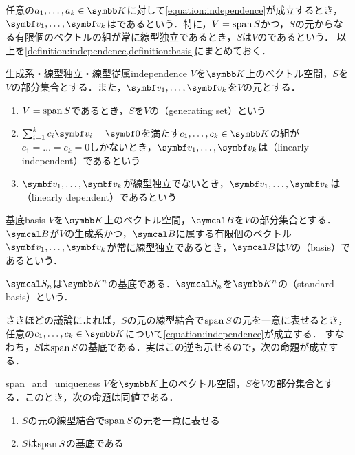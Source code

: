 \documentclass[../../main]{subfiles}
\begin{document}
任意の\(a_1,\dots,a_k\in\numset{K}\)に対して\cref{equation:independence}が成立するとき，
\(\vect{v}_1,\dots,\vect{v}_k\)はであるという．特に，\(V=\operatorname{span} S\)かつ，\(S\)の元からなる有限個のベクトルの組が常に線型独立であるとき，\(S\)は\(V\)のであるという．
以上を\cref{definition:independence,definition:basis}にまとめておく．

\begin{definition}{生成系・線型独立・線型従属}{independence}
  \(V\)を\(\numset{K}\)上のベクトル空間，\(S\)を\(V\)の部分集合とする．また，\(\vect{v}_1,\dots,\vect{v}_k\)を\(V\)の元とする．
  \begin{enumerate}
    \item \(V=\operatorname{span} S\)であるとき，\(S\)を\(V\)の（generating set）という
    \item \(\sum_{i=1}^kc_i\vect{v}_i=\zvec\)を満たす\(c_1,\dots,c_k\in\numset{K}\)の組が\(c_1=\dots=c_k=0\)しかないとき，\(\vect{v}_1,\dots,\vect{v}_k\)は（linearly independent）であるという
    \item \(\vect{v}_1,\dots,\vect{v}_k\)が線型独立でないとき，\(\vect{v}_1,\dots,\vect{v}_k\)は（linearly dependent）であるという
  \end{enumerate}
\end{definition}

\begin{definition}{基底}{basis}
  \(V\)を\(\numset{K}\)上のベクトル空間，\(\basis{B}\)を\(V\)の部分集合とする．
  \(\basis{B}\)が\(V\)の生成系かつ，\(\basis{B}\)に属する有限個のベクトル\(\vect{v}_1,\dots,\vect{v}_k\)が常に線型独立であるとき，\(\basis{B}\)は\(V\)の（basis）であるという．
\end{definition}

\begin{example}[標準基底]
  \(\basis{S}_n\)は\(\numset{K}^n\)の基底である．\(\basis{S}_n\)を\(\numset{K}^n\)の（standard basis）という．
\end{example}

さきほどの議論によれば，\(S\)の元の線型結合で\(\operatorname{span} S\)の元を一意に表せるとき，任意の\(c_1,\dots,c_k\in\numset{K}\)について\cref{equation:independence}が成立する．
すなわち，\(S\)は\(\operatorname{span} S\)の基底である．実はこの逆も示せるので，次の命題が成立する．

\begin{proposition}{}{span_and_uniqueness}
  \(V\)を\(\numset{K}\)上のベクトル空間，\(S\)を\(V\)の部分集合とする．このとき，次の命題は同値である．
  \begin{enumerate}
    \item \(S\)の元の線型結合で\(\operatorname{span} S\)の元を一意に表せる
    \item \(S\)は\(\operatorname{span} S\)の基底である
  \end{enumerate}
\end{proposition}
\end{document}

